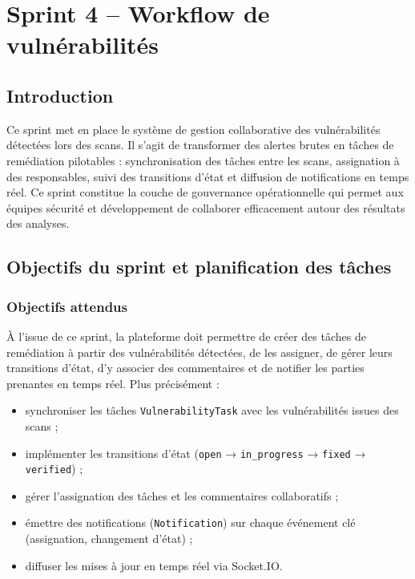 \chapter{Sprint 4 -- Workflow de vulnérabilités}

\section{Introduction}
Ce sprint met en place le système de gestion collaborative des vulnérabilités détectées lors des scans. Il s'agit de transformer des alertes brutes en tâches de remédiation pilotables : synchronisation des tâches entre les scans, assignation à des responsables, suivi des transitions d'état et diffusion de notifications en temps réel. Ce sprint constitue la couche de gouvernance opérationnelle qui permet aux équipes sécurité et développement de collaborer efficacement autour des résultats des analyses.

\section{Objectifs du sprint et planification des tâches}

\subsection{Objectifs attendus}
À l'issue de ce sprint, la plateforme doit permettre de créer des tâches de remédiation à partir des vulnérabilités détectées, de les assigner, de gérer leurs transitions d'état, d'y associer des commentaires et de notifier les parties prenantes en temps réel. Plus précisément :
\begin{itemize}
  \item synchroniser les tâches \texttt{VulnerabilityTask} avec les vulnérabilités issues des scans ;
  \item implémenter les transitions d'état (\texttt{open} → \texttt{in\_progress} → \texttt{fixed} → \texttt{verified}) ;
  \item gérer l'assignation des tâches et les commentaires collaboratifs ;
  \item émettre des notifications (\texttt{Notification}) sur chaque événement clé (assignation, changement d'état) ;
  \item diffuser les mises à jour en temps réel via Socket.IO.
\end{itemize}

